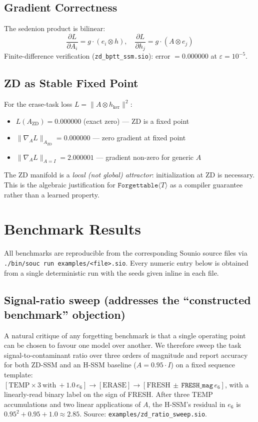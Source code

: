 \documentclass{article}
\newcommand{\ZD}{\mathrm{ZD}}
\newcommand{\Forgettable}[1]{\texttt{Forgettable}\langle #1 \rangle}
\begin{document}
\subsection{Gradient Correctness}

The sedenion product is bilinear:
\[
  \frac{\partial L}{\partial A_i} = g \cdot (e_i \otimes h), \quad
  \frac{\partial L}{\partial h_j} = g \cdot (A \otimes e_j)
\]
Finite-difference verification (\texttt{zd\_bptt\_ssm.sio}):
error $= 0.000000$ at $\varepsilon = 10^{-5}$.

\subsection{ZD as Stable Fixed Point}

For the erase-task loss $L = \|A \otimes h_{\ker}\|^2$:
\begin{itemize}
  \item $L(A_{\ZD}) = 0.000000$ (exact zero) --- ZD is a fixed point
  \item $\|\nabla_A L\|_{A_{\ZD}} = 0.000000$ --- zero gradient at fixed point
  \item $\|\nabla_A L\|_{A=I} = 2.000001$ --- gradient non-zero for generic $A$
\end{itemize}
The ZD manifold is a \emph{local (not global) attractor}: initialization at ZD is
necessary. This is the algebraic justification for $\Forgettable{T}$ as a
compiler guarantee rather than a learned property.

\section{Benchmark Results}
\label{sec:benchmarks}

All benchmarks are reproducible from the corresponding Sounio source files via
\texttt{./bin/souc run examples/<file>.sio}. Every numeric entry below is
obtained from a single deterministic run with the seeds given inline in each
file.

\subsection{Signal-ratio sweep (addresses the ``constructed benchmark''
objection)}
\label{sec:sweep}

A natural critique of any forgetting benchmark is that a single operating
point can be chosen to favour one model over another. We therefore sweep the
task signal-to-contaminant ratio over three orders of magnitude and report
accuracy for both ZD-SSM and an H-SSM baseline ($A = 0.95 \cdot I$) on a
fixed sequence template: $[\mathrm{TEMP}\!\times\!3\ \text{with}\ +1.0\,e_6]
\to [\mathrm{ERASE}] \to [\mathrm{FRESH}\,\pm\,\mathtt{FRESH\_mag}\,e_6]$, with
a linearly-read binary label on the sign of FRESH. After three TEMP
accumulations and two linear applications of $A$, the H-SSM's residual in
$e_6$ is $0.95^2 + 0.95 + 1.0 \approx 2.85$. Source:
\texttt{examples/zd\_ratio\_sweep.sio}.
\end{document}
